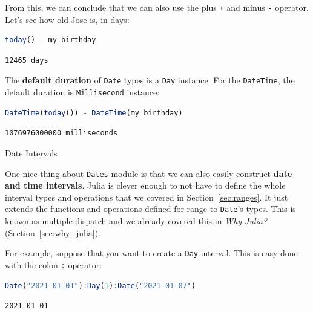 \documentclass[
  notoc %
]{tufte-book}
\makeatletter
\newcommand{\passthrough}[1]{#1}
\renewcommand\subsubsection{%
\@startsection{subsubsection}{3}{\z@ }{-3.25ex\@plus -1ex \@minus -.2ex}{1.5ex \@plus .2ex}{\normalfont \normalsize \bfseries }
}
\makeatother
\begin{document}
From this, we can conclude that we can also use the plus
\passthrough{\lstinline!+!} and minus \passthrough{\lstinline!-!}
operator. Let's see how old Jose is, in days:

\begin{lstlisting}[language=Julia]
today() - my_birthday
\end{lstlisting}

\begin{lstlisting}[language=Output]
12465 days
\end{lstlisting}

The \textbf{default duration} of \passthrough{\lstinline!Date!} types is
a \passthrough{\lstinline!Day!} instance. For the
\passthrough{\lstinline!DateTime!}, the default duration is
\passthrough{\lstinline!Millisecond!} instance:

\begin{lstlisting}[language=Julia]
DateTime(today()) - DateTime(my_birthday)
\end{lstlisting}

\begin{lstlisting}[language=Output]
1076976000000 milliseconds
\end{lstlisting}

\hypertarget{sec:dates_intervals}{%
\subsubsection{Date Intervals}\label{sec:dates_intervals}}

One nice thing about \passthrough{\lstinline!Dates!} module is that we
can also easily construct \textbf{date and time intervals}. Julia is
clever enough to not have to define the whole interval types and
operations that we covered in Section~\ref{sec:ranges}. It just extends
the functions and operations defined for range to
\passthrough{\lstinline!Date!}'s types. This is known as multiple
dispatch and we already covered this in \emph{Why Julia?}
(Section~\ref{sec:why_julia}).

For example, suppose that you want to create a
\passthrough{\lstinline!Day!} interval. This is easy done with the colon
\passthrough{\lstinline!:!} operator:

\begin{lstlisting}[language=Julia]
Date("2021-01-01"):Day(1):Date("2021-01-07")
\end{lstlisting}

\begin{lstlisting}[language=Output]
2021-01-01
\end{lstlisting}
\end{document}
